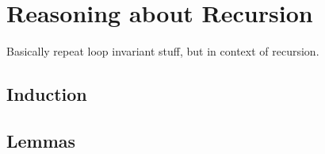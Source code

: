 \chapter{Reasoning about Recursion}
\label{c_reasoning_recursion}
Basically repeat loop invariant stuff, but in context of recursion.

\section{Induction}
\section{Lemmas}